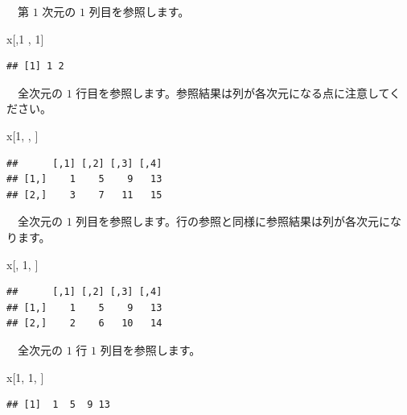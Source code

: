 \documentclass[
  12pt,
]{book}
\newenvironment{Shaded}{\begin{snugshade}}{\end{snugshade}}
\newcommand{\DecValTok}[1]{\textcolor[rgb]{0.00,0.00,0.81}{#1}}
\newcommand{\NormalTok}[1]{#1}
\begin{document}
　第 \(1\) 次元の \(1\) 列目を参照します。

\begin{Shaded}
\begin{Highlighting}[numbers=left,,]
\NormalTok{x[,}\DecValTok{1}\NormalTok{ , }\DecValTok{1}\NormalTok{]}
\end{Highlighting}
\end{Shaded}

\begin{verbatim}
## [1] 1 2
\end{verbatim}

　全次元の \(1\) 行目を参照します。参照結果は列が各次元になる点に注意してください。

\begin{Shaded}
\begin{Highlighting}[numbers=left,,]
\NormalTok{x[}\DecValTok{1}\NormalTok{, , ]}
\end{Highlighting}
\end{Shaded}

\begin{verbatim}
##      [,1] [,2] [,3] [,4]
## [1,]    1    5    9   13
## [2,]    3    7   11   15
\end{verbatim}

　全次元の \(1\) 列目を参照します。行の参照と同様に参照結果は列が各次元になります。

\begin{Shaded}
\begin{Highlighting}[numbers=left,,]
\NormalTok{x[, }\DecValTok{1}\NormalTok{, ]}
\end{Highlighting}
\end{Shaded}

\begin{verbatim}
##      [,1] [,2] [,3] [,4]
## [1,]    1    5    9   13
## [2,]    2    6   10   14
\end{verbatim}

　全次元の \(1\) 行 \(1\) 列目を参照します。

\begin{Shaded}
\begin{Highlighting}[numbers=left,,]
\NormalTok{x[}\DecValTok{1}\NormalTok{, }\DecValTok{1}\NormalTok{, ]}
\end{Highlighting}
\end{Shaded}

\begin{verbatim}
## [1]  1  5  9 13
\end{verbatim}
\end{document}
